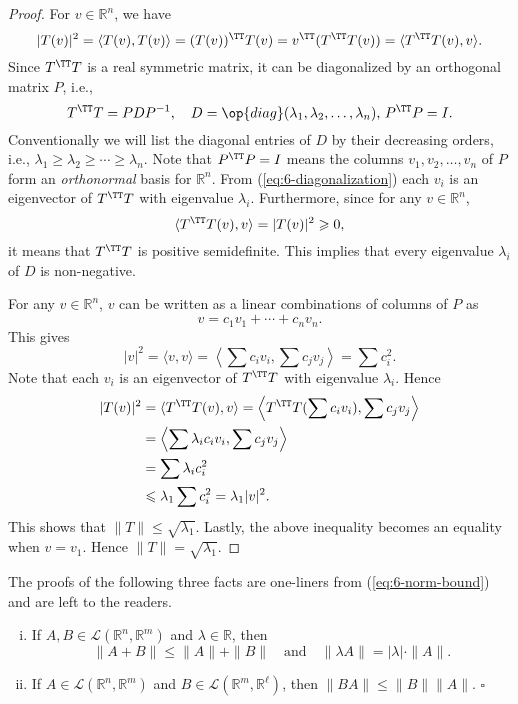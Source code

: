 \documentclass[11pt]{article}
\begin{document}
\begin{proof}
  For $v \in \mathbb{R}^n$, we have
  \[
    | T(v) |^2 = \langle T(v), T(v) \rangle = (T(v))^\TT T(v) = v^\TT (T^\TT T(v)) = \langle T^\TT T(v), v \rangle.
  \]
  Since $T^\TT T$ is a real symmetric matrix, it can be diagonalized by an orthogonal matrix $P$, i.e.,
  \begin{equation}
    \label{eq:6-diagonalization}
    T^\TT T = P D P^{-1}, \quad D = \op{diag}(\lambda_1, \lambda_2, \dots, \lambda_n), \,
    P^\TT P = I.
  \end{equation}
  Conventionally we will list the diagonal entries of $D$ by their decreasing orders, i.e., $\lambda_1 \geqslant \lambda_2 \geqslant \cdots \geqslant \lambda_n$.
  Note that $P^\TT P = I$ means the columns $v_1, v_2, \dots, v_n$ of $P$ form an \textit{orthonormal} basis for $\mathbb{R}^n$.  From (\ref{eq:6-diagonalization}) each $v_i$ is an eigenvector of $T^\TT T$ with eigenvalue $\lambda_i$.
  Furthermore, since for any $v \in \mathbb{R}^n$,
  \[
    \langle T^\TT T(v), v \rangle = | T(v) |^2 \geqslant 0,
  \]
  it means that $T^\TT T$ is positive semidefinite.
  This implies that every eigenvalue $\lambda_i$ of $D$ is non-negative.

  For any $v \in \mathbb{R}^n$, $v$ can be written as a linear combinations of columns of $P$ as
  \[
    v = c_1 v_1 + \cdots + c_n v_n.
  \]
  This gives
  \[
    |v|^2 = \langle v, v \rangle = \left\langle \sum c_i v_i, \sum c_j v_j \right\rangle = \sum c_i^2.
  \]
  Note that each $v_i$ is an eigenvector of $T^\TT T$ with eigenvalue $\lambda_i$.
  Hence
  \begin{align*}
    |T(v)|^2 &= \langle T^\TT T(v), v \rangle 
    = \left\langle T^\TT T( \sum c_i v_i ), \sum c_j v_j \right\rangle \\
    &= \left\langle \sum \lambda_i c_i v_i, \sum c_j v_j \right\rangle \\
    &= \sum \lambda_i c_i^2 \\
    &\leqslant \lambda_1 \sum c_i^2 = \lambda_1 |v|^2.
  \end{align*}
  This shows that $\| T \| \leqslant \sqrt{\lambda_1}$.
  Lastly, the above inequality becomes an equality when $v=v_1$.
  Hence $\| T \| = \sqrt{\lambda_1}$.
\end{proof}

The proofs of the following three facts are one-liners from (\ref{eq:6-norm-bound}) and are left to the readers.

\begin{thm}
  \begin{enumerate}[(i)]
    \item If $A, B \in \mathcal{L}(\mathbb{R}^n, \mathbb{R}^m)$ and $\lambda \in \mathbb{R}$, then
      \[
	\| A + B \| \leqslant \| A \| + \| B \| \quad \text{and} \quad \| \lambda A \| = |\lambda| \cdot \| A \|.
      \]

    \item If $A \in \mathcal{L}(\mathbb{R}^n, \mathbb{R}^m)$ and $B \in \mathcal{L}(\mathbb{R}^m, \mathbb{R}^\ell)$, then $\| BA \| \leqslant \|B\|\|A\|$.  \hfill$\square$
  \end{enumerate}
\end{thm}
\end{document}

